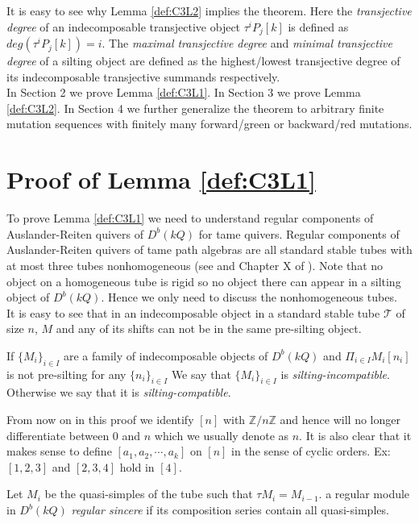 \indent It is easy to see why Lemma \ref{def:C3L2} implies the theorem. Here the \textit{transjective degree} of an indecomposable transjective object $\tau^iP_j[k]$ is defined as $deg(\tau^iP_j[k])=i$. The \textit{maximal transjective degree} and \textit{minimal transjective degree} of a silting object are defined as the highest/lowest transjective degree of its indecomposable transjective summands respectively.\\
\indent In Section 2 we prove Lemma \ref{def:C3L1}. In Section 3 we prove Lemma \ref{def:C3L2}. In Section 4 we further generalize the theorem to arbitrary finite mutation sequences with finitely many forward/green or backward/red mutations.\\
\section{Proof of Lemma \ref{def:C3L1}}
\indent To prove Lemma \ref{def:C3L1} we need to understand regular components of Auslander-Reiten quivers of $D^b(kQ)$ for tame quivers. Regular components of Auslander-Reiten quivers of tame path algebras are all standard stable tubes with at most three tubes nonhomogeneous (see \cite{DR76} and Chapter X of \cite{SS06}). Note that no object on a homogeneous tube is rigid so no object there can appear in a silting object of $D^b(kQ)$. Hence we only need to discuss the nonhomogeneous tubes.\\
\indent It is easy to see that in an indecomposable object in a standard stable tube $\mathcal{T}$ of size $n$, $M$ and any of its shifts can not be in the same pre-silting object.\\ 
\begin{definition}
If $\{M_i\}_{i\in I}$ are a family of indecomposable objects of $D^b(kQ)$ and $\Pi_{i\in I}M_i[n_i]$ is not pre-silting for any $\{n_i\}_{i\in I}$ We say that $\{M_i\}_{i\in I}$ is \textit{silting-incompatible}. Otherwise we say that it is \textit{silting-compatible}.
\end{definition}
\indent From now on in this proof we identify $[n]$ with $\mathbb{Z}/n\mathbb{Z}$ and hence will no longer differentiate between $0$ and $n$ which we usually denote as $n$. It is also clear that it makes sense to define $[a_1, a_2,\cdots, a_k]$ on $[n]$ in the sense of cyclic orders. Ex: $[1,2,3]$ and $[2,3,4]$ hold in $[4]$.\\
\begin{definition}
Let $M_i$ be the quasi-simples of the tube such that $\tau M_i=M_{i-1}$. a regular module in $D^b(kQ)$ \textit{regular sincere} if its composition series contain all quasi-simples.
\end{definition}
